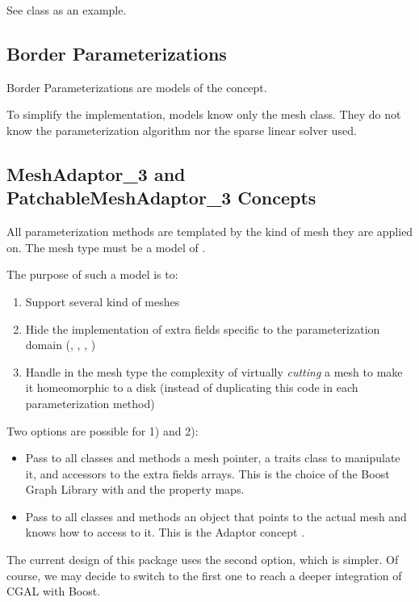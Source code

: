 See  class as an example.


\subsection{Border Parameterizations}

Border Parameterizations are models of the  concept.

To simplify the implementation,  models know only the
 mesh class. They do not know the parameterization algorithm
nor the sparse linear solver used.


\subsection{MeshAdaptor\_3 and PatchableMeshAdaptor\_3 Concepts}

All parameterization methods are templated by the kind of mesh they are applied on.
The mesh type must be a model of .

The purpose of such a model is to:
\begin{enumerate}
\item Support several kind of meshes
\item Hide the implementation of extra fields specific to the parameterization domain
      (, , , )
\item Handle in the mesh type the complexity of virtually {\em cutting} a mesh
      to make it homeomorphic to a disk (instead of duplicating this
      code in each parameterization method)
\end{enumerate}

Two options are possible for 1) and 2):
\begin{itemize}
\item Pass to all classes and methods a mesh pointer, a traits class to manipulate it,
      and accessors to the extra fields arrays.
      This is the choice of the Boost Graph Library with 
      and the property maps.
\item Pass to all classes and methods an object that points to the actual mesh and knows
      how to access to it. This is the Adaptor concept \cite{cgal:ghjv-dpero-95}.
\end{itemize}

The current design of this package uses the second option, which is simpler.
Of course, we may decide to switch to the first one to reach a deeper integration
of CGAL with Boost.

